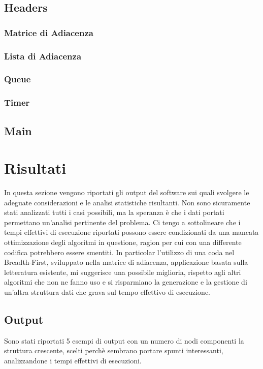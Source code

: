 \documentclass{article}
\begin{document}
\subsection{Headers}
\subsubsection{Matrice di Adiacenza}

\subsubsection{Lista di Adiacenza}

\subsubsection{Queue}

\subsubsection{Timer}

\subsection{Main}


\newpage
\section{Risultati}
In questa sezione vengono riportati gli output del software sui quali svolgere le adeguate considerazioni e le analisi statistiche risultanti.\newline
Non sono sicuramente stati analizzati tutti i casi possibili, ma la speranza \`e che i dati portati permettano un'analisi pertinente del problema. \newline
Ci tengo a sottolineare che i tempi effettivi di esecuzione riportati possono essere condizionati da una mancata ottimizzazione degli algoritmi in questione, ragion per cui con una differente codifica potrebbero essere smentiti. In particolar l'utilizzo di una coda nel Breadth-First, sviluppato nella matrice di adiacenza, applicazione basata sulla letteratura esistente, mi suggerisce una possibile miglioria, rispetto agli altri algoritmi che non ne fanno uso e si risparmiano la generazione e la gestione di un'altra struttura dati che grava sul tempo effettivo di esecuzione.

\subsection{Output}
Sono stati riportati 5 esempi di output con un numero di nodi componenti la struttura crescente, scelti perch\`e sembrano portare spunti interessanti, analizzandone i tempi effettivi di esecuzioni. \newline
\end{document}
